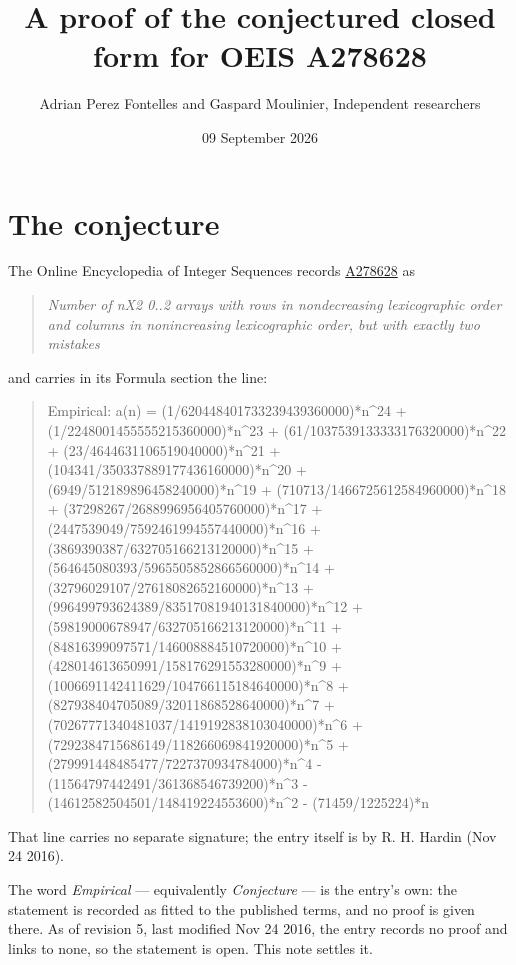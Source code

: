 \documentclass[11pt]{article}
\title{A proof of the conjectured closed form for OEIS A278628}
\author{Adrian Perez Fontelles and Gaspard Moulinier, Independent researchers}
\date{09 September 2026}
\theoremstyle{definition}
\begin{document}
\maketitle
\section{The conjecture}

The Online Encyclopedia of Integer Sequences records \href{https://oeis.org/A278628}{A278628} as

\begin{quote}\itshape Number of nX2 0..2 arrays with rows in nondecreasing lexicographic order and columns in nonincreasing lexicographic order, but with exactly two mistakes\end{quote}

and carries in its Formula section the line:

\begin{quote}\ttfamily Empirical: a(n) = (1/620448401733239439360000)*n\textasciicircum{}24 + (1/2248001455555215360000)*n\textasciicircum{}23 + (61/1037539133333176320000)*n\textasciicircum{}22 + (23/4644631106519040000)*n\textasciicircum{}21 + (104341/350337889177436160000)*n\textasciicircum{}20 + (6949/512189896458240000)*n\textasciicircum{}19 + (710713/1466725612584960000)*n\textasciicircum{}18 + (37298267/2688996956405760000)*n\textasciicircum{}17 + (2447539049/7592461994557440000)*n\textasciicircum{}16 + (3869390387/632705166213120000)*n\textasciicircum{}15 + (564645080393/5965505852866560000)*n\textasciicircum{}14 + (32796029107/27618082652160000)*n\textasciicircum{}13 + (996499793624389/83517081940131840000)*n\textasciicircum{}12 + (59819000678947/632705166213120000)*n\textasciicircum{}11 + (84816399097571/146008884510720000)*n\textasciicircum{}10 + (428014613650991/158176291553280000)*n\textasciicircum{}9 + (1006691142411629/104766115184640000)*n\textasciicircum{}8 + (827938404705089/32011868528640000)*n\textasciicircum{}7 + (70267771340481037/1419192838103040000)*n\textasciicircum{}6 + (7292384715686149/118266069841920000)*n\textasciicircum{}5 + (279991448485477/7227370934784000)*n\textasciicircum{}4 - (11564797442491/361368546739200)*n\textasciicircum{}3 - (14612582504501/148419224553600)*n\textasciicircum{}2 - (71459/1225224)*n\end{quote}

That line carries no separate signature; the entry itself is by R. H. Hardin (Nov 24 2016).

The word {\itshape Empirical} --- equivalently {\itshape Conjecture} --- is the entry's own: the statement is recorded as fitted to the published terms, and no proof is given there. As of revision 5, last modified Nov 24 2016, the entry records no proof and links to none, so the statement is open. This note settles it.
\end{document}
